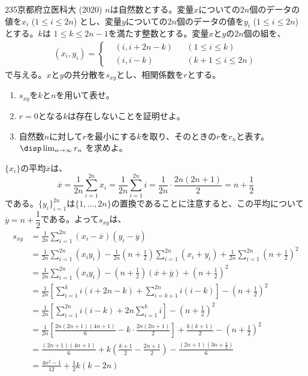 \begin{prob}{235}{}{京都府立医科大 (2020)}
 $n$は自然数とする。変量$x$についての$2n$個のデータの値を$x_i$ ($1\le i\le 2n$) とし、変量$y$についての$2n$個のデータの値を$y_i$ ($1\le i\le 2n$) とする。$k$は $1\le k\le 2n-1$を満たす整数とする。変量$x$と$y$の$2n$個の組を、
 \begin{align*}
  (x_i,y_i)=\left\{
  \begin{aligned}
   &(i,i+2n-k) & &(1\le i\le k) \\
   &(i,i-k) & &(k+1\le i\le 2n)
  \end{aligned}
  \right.
 \end{align*}
 で与える。$x$と$y$の共分散を$s_{xy}$とし、相関係数を$r$とする。
 \begin{enumerate}
  \item $s_{xy}$を$k$と$n$を用いて表せ。
  \item $r=0$となる$k$は存在しないことを証明せよ。
  \item 自然数$n$に対して$r$を最小にする$k$を取り、そのときの$r$を$r_n$と表す。$\disp \lim_{n\to\infty} r_n$ を求めよ。
 \end{enumerate}
\end{prob}
$\{x_i\}$の平均$\overline{x}$は、
\[ \overline{x}=\frac{1}{2n}\sum_{i=1}^{2n}x_i=\frac{1}{2n}\sum_{i=1}^{2n}i=\frac{1}{2n}\cdot\frac{2n(2n+1)}{2}=n+\frac{1}{2} \]
である。$\{y_i\}_{i=1}^{2n}$は$\{1,\dots,2n\}$の置換であることに注意すると、この平均について$\overline{y}=n+\dfrac{1}{2}$である。よって$s_{xy}$は、
\footnotesize
\begin{align*}
 s_{xy}&=\frac{1}{2n}\sum_{i=1}^{2n}(x_i-\overline{x})(y_i-\overline{y}) \\
 &=\frac{1}{2n}\sum_{i=1}^{2n}(x_iy_i)-\frac{1}{2n}\left(n+\frac{1}{2}\right)\sum_{i=1}^{2n}(x_i+y_i)+\frac{1}{2n}\sum_{i=1}^{2n}\left(n+\frac{1}{2}\right)^2 \\
 &=\frac{1}{2n}\sum_{i=1}^{2n}(x_iy_i)-\left(n+\frac{1}{2}\right)(\overline{x}+\overline{y})+\left(n+\frac{1}{2}\right)^2 \\
 &=\frac{1}{2n}\left[\sum_{i=1}^ki(i+2n-k)+\sum_{i=k+1}^{2n}i(i-k)\right]-\left(n+\frac{1}{2}\right)^2 \\
 &=\frac{1}{2n}\left[\sum_{i=1}^{2n}i(i-k)+2n\sum_{i=1}^ki\right]-\left(n+\frac{1}{2}\right)^2 \\
 &=\frac{1}{2n}\left[\frac{2n(2n+1)(4n+1)}{6}-k\cdot\frac{2n(2n+1)}{2}\right]+\frac{k(k+1)}{2}-\left(n+\frac{1}{2}\right)^2 \\
 &=\frac{(2n+1)(4n+1)}{6}+k\left(\frac{k+1}{2}-\frac{2n+1}{2}\right)-\frac{(2n+1)(3n+\frac{3}{2})}{6} \\
 &=\frac{4n^2-1}{12}+\frac{1}{2}k(k-2n)
\end{align*}
\normalsize

